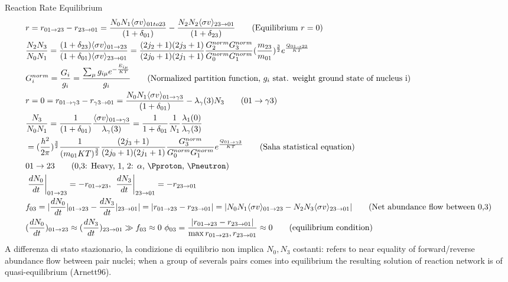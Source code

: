 \begin{frame}{Reaction Rate Equilibrium}
    \begin{align*}
        &r=r_{01\to23}-r_{23\to01}=\frac{N_0N_1\exv{\sigma v}_{01to23}}{(1+\delta_{01})}-\frac{N_2N_2\exv{\sigma v}_{23\to01}}{(1+\delta_{23})}\tag{Equilibrium $r=0$}\\
        &\frac{N_2N_3}{N_0N_1}=\frac{(1+\delta_{23})\exv{\sigma v}_{01\to23}}{(1+\delta_{01})\exv{\sigma v}_{23\to01}}=\frac{(2j_2+1)(2j_3+1)}{(2j_0+1)(2j_1+1)}\frac{G_2^{norm}G_3^{norm}}{G_0^{norm}G_1^{norm}}(\frac{m_{23}}{m_{01}})^{\frac{3}{2}}\exp{\frac{Q_{01\to23}}{KT}}\\
        &G_i^{norm}=\frac{G_i}{g_i}=\frac{\sum_{\mu}g_{i\mu}\exp{-\frac{E_{i\mu}}{KT}}}{g_i}\tag{Normalized partition function, $g_i$ stat. weight ground state of nucleus i}\\
        &r=0=r_{01\to\gamma3}-r_{\gamma3\to01}=\frac{N_0N_1\exv{\sigma v}_{01\to\gamma3}}{(1+\delta_{01})}-\lambda_{\gamma}(3)N_3\tag{$01\to\gamma3$}\\
        &\frac{N_3}{N_0N_1}=\frac{1}{(1+\delta_{01})}\frac{\exv{\sigma v}_{01\to\gamma3}}{\lambda_{\gamma}(3)}=\frac{1}{1+\delta_{01}}\frac{1}{N_1}\frac{\lambda_1(0)}{\lambda_{\gamma}(3)}\\
        &=(\frac{h^2}{2\pi})^{\frac{3}{2}}\frac{1}{(m_{01}KT)^{\frac{3}{2}}}\frac{(2j_3+1)}{(2j_0+1)(2j_1+1)}\frac{G_3^{norm}}{G_0^{norm}G_1^{norm}}\exp{\frac{Q_{01\to\gamma3}}{KT}}\tag{Saha statistical equation}\\
            &01\to23\tag{$0$,$3$: Heavy, $1$, $2$: $\alpha$, \Pproton, \Pneutron}\\
            &\left.\TDy{t}{N_0}\right|_{01\to23}=-r_{01\to23},\ \left.\TDy{t}{N_3}\right|_{23\to01}=-r_{23\to01}\\
                    &f_{03}=|\TDy{t}{N_0}|_{01\to23}-\TDy{t}{N_3}|_{23\to01}|=|r_{01\to23}-r_{23\to01}|=|N_0N_1\exv{\sigma v}_{01\to23}-N_2N_3\exv{\sigma v}_{23\to01}|\tag{Net abundance flow between 0,3}\\
                    &(\TDy{t}{N_0})_{01\to23}\approx(\TDy{t}{N_3})_{23\to01}\gg f_{03}\approx0\ \phi_{03}=\frac{|r_{01\to23}-r_{23\to01}|}{\max{r_{01\to23},r_{23\to01}}}\approx0\tag{equilibrium condition}
                            \end{align*}
        A differenza di stato stazionario, la condizione di equilibrio non implica $N_0,N_3$ costanti: refers to near equality of forward/reverse abundance flow between pair nuclei; when a group of severals pairs comes into equilibrium the resulting solution of reaction network is of quasi-equilibrium (Arnett96).
\end{frame}

